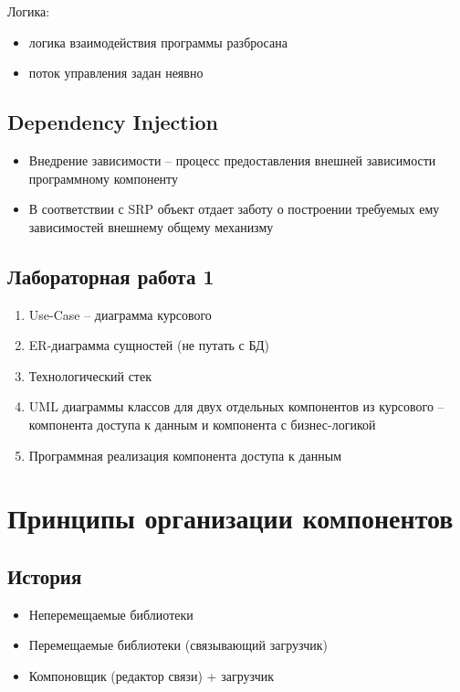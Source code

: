 Логика:

\begin{itemize}
    \item логика взаимодействия программы разбросана
    \item поток управления задан неявно
\end{itemize}

\subsection{Dependency Injection}

\begin{itemize}
    \item Внедрение зависимости -- процесс предоставления внешней
        зависимости программному компоненту
    \item В соответствии с SRP объект отдает заботу о построении
        требуемых ему зависимостей внешнему общему механизму
\end{itemize}

\subsection{Лабораторная работа 1}

\begin{enumerate}
    \item Use-Case -- диаграмма курсового
    \item ER-диаграмма сущностей (не путать с БД)
    \item Технологический стек
    \item UML диаграммы классов для двух отдельных компонентов из
        курсового -- компонента доступа к данным и компонента с
        бизнес-логикой
    \item Программная реализация компонента доступа к данным
\end{enumerate}

\section{Принципы организации компонентов}

\subsection{История}

\begin{itemize}
    \item Неперемещаемые библиотеки
    \item Перемещаемые библиотеки (связывающий загрузчик)
    \item Компоновщик (редактор связи) + загрузчик
\end{itemize}

